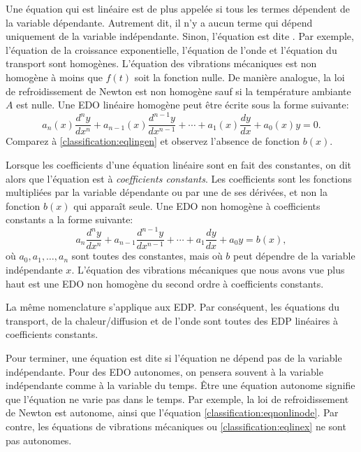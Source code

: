 Une équation qui est linéaire est de plus appelée \emph{}
si tous les termes dépendent de la variable dépendante.
Autrement dit, il n'y a aucun terme qui dépend uniquement de la variable indépendante.
Sinon, l'équation est dite \emph{}.
Par exemple, l'équation de la croissance exponentielle, l'équation de l'onde et l'équation du transport sont homogènes.
L'équation des vibrations mécaniques est non homogène à moins que $f(t)$ soit la fonction nulle.
De manière analogue, la loi de refroidissement de Newton est non homogène sauf si la température ambiante $A$ est nulle.
Une EDO linéaire homogène peut être écrite sous la forme suivante:
\begin{equation*}
a_n(x) \frac{d^n y}{dx^n}
	+ a_{n-1}(x) \frac{d^{n-1} y}{dx^{n-1}}
	+ \cdots
	+ a_{1}(x) \frac{dy}{dx}
	+ a_{0}(x) y = 0 .
\end{equation*}
Comparez à \eqref{classification:eqlingen} et observez l'absence de fonction $b(x)$.

\medskip

Lorsque les coefficients d'une équation linéaire sont en fait des constantes,
on dit alors que l'équation est à \emph{coefficients constants}.
Les coefficients sont les fonctions multipliées par la variable dépendante ou par une de ses dérivées,
et non la fonction $b(x)$ qui apparaît seule.
Une EDO non homogène à coefficients constants a la forme suivante:
\begin{equation*}
	a_n \frac{d^n y}{dx^n}
		+ a_{n-1} \frac{d^{n-1} y}{dx^{n-1}}
		+ \cdots
		+ a_{1} \frac{dy}{dx}
		+ a_{0} y
		= b(x),
\end{equation*}
où $a_0, a_1, \ldots, a_n$ sont toutes des constantes, mais où
$b$ peut dépendre de la variable indépendante $x$.
L'équation des vibrations mécaniques que nous avons vue plus haut est une
EDO non homogène du second ordre à coefficients constants.

La même nomenclature s'applique aux EDP.
Par conséquent, les équations du transport, de la chaleur/diffusion et
de l'onde sont toutes des EDP linéaires à coefficients constants.

\medskip

Pour terminer, une équation est dite \emph{}
 si l'équation ne dépend pas de la variable indépendante.
 Pour des EDO autonomes, on pensera souvent à la variable indépendante comme à la variable du temps.
 Être une équation autonome signifie que l'équation ne varie pas dans le temps.
 Par exemple, la loi de refroidissement de Newton est autonome, ainsi que l'équation \eqref{classification:eqnonlinode}.
 Par contre, les équations de vibrations mécaniques ou \eqref{classification:eqlinex} ne sont pas autonomes.

